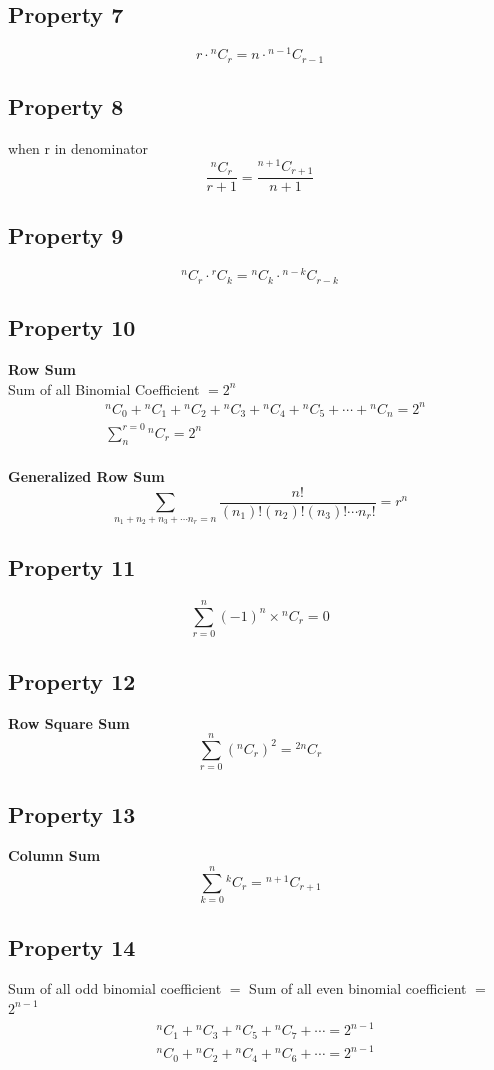 \documentclass[12pt]{article}
\begin{document}
\subsection*{Property 7}
\[
\boxed{r\cdot{}^{n}C_{r} = n \cdot{}^{n-1}C_{r-1}}
\]
\subsection*{Property 8}
when r in denominator
\[
\boxed{\frac{{}^{n}C_{r}}{r+1} = \frac{^{n+1}C_{r+1}}{n+1}}
\]
\subsection*{Property 9}
\[
\boxed{ {}^{n}C_{r} \cdot {}^{r}C_{k}  = {}^{n}C_{k} \cdot {}^{n-k}C_{r-k}}
\]

\subsection*{Property 10}
\textbf{Row Sum}\\
Sum of all Binomial Coefficient $= 2^n$
\[
\begin{aligned}
    &{}^{n}C_{0}+{}^{n}C_{1}+{}^{n}C_{2}+{}^{n}C_{3}+{}^{n}C_{4}+{}^{n}C_{5}+\cdots+{}^{n}C_{n} = 2^n \\
    &\sum_{n}^{r=0}{}^{n}C_{r} = 2^n
\end{aligned}
\]
\\
\textbf{Generalized Row Sum} \[
\sum_{n_1+n_2+n_3+ \cdots n_r = n} \frac{n!}{(n_1)!(n_2)!(n_3)! \cdots n_r!} = r^n
\]

\subsection*{Property 11}
\[
\sum^{n}_{r=0} (-1)^n \times {}^{n}C_{r} = 0
\]
\subsection*{Property 12}
\textbf{Row Square Sum}
\[
\sum^{n}_{r=0} \left({}^{n}C_{r}\right)^2 = {}^{2n}C_{r}
\]
\subsection*{Property 13}
\textbf{Column Sum}
\[
\sum^{n}_{k=0} {}^{k}C_{r} = {}^{n+1}C_{r+1}
\]
\subsection*{Property 14}
Sum of all odd binomial coefficient $=$ Sum of all even binomial coefficient $=$ $2^{n-1}$
\[
\begin{aligned}
     &{}^{n}C_{1}+{}^{n}C_{3}+{}^{n}C_{5}+{}^{n}C_{7}+\cdots = 2^{n-1} \\
     &{}^{n}C_{0}+{}^{n}C_{2}+{}^{n}C_{4}+{}^{n}C_{6}+\cdots = 2^{n-1}
\end{aligned}
\]
\end{document}
